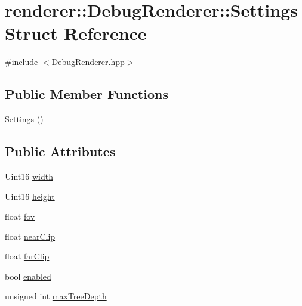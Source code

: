 \hypertarget{structrenderer_1_1DebugRenderer_1_1Settings}{\section{renderer\-:\-:Debug\-Renderer\-:\-:Settings Struct Reference}
\label{structrenderer_1_1DebugRenderer_1_1Settings}
}


{\ttfamily \#include $<$Debug\-Renderer.\-hpp$>$}

\subsection*{Public Member Functions}
\begin{DoxyCompactItemize}
\item 
\hyperlink{structrenderer_1_1DebugRenderer_1_1Settings_ae18a3d7d11b0ff74574f40cc35790f79}{Settings} ()
\end{DoxyCompactItemize}
\subsection*{Public Attributes}
\begin{DoxyCompactItemize}
\item 
Uint16 \hyperlink{structrenderer_1_1DebugRenderer_1_1Settings_acb80e3e6daf15e6cd798a7681e6fdb12}{width}
\item 
Uint16 \hyperlink{structrenderer_1_1DebugRenderer_1_1Settings_add135bc9fc4b150f2b90afff55f2af95}{height}
\item 
float \hyperlink{structrenderer_1_1DebugRenderer_1_1Settings_a27cdd58468aea209a6b53ca0cb0cbcef}{fov}
\item 
float \hyperlink{structrenderer_1_1DebugRenderer_1_1Settings_a4522926071f9aad85caf900687fd84ab}{near\-Clip}
\item 
float \hyperlink{structrenderer_1_1DebugRenderer_1_1Settings_ab95b5972b6bca48dd3883b053ca652b4}{far\-Clip}
\item 
bool \hyperlink{structrenderer_1_1DebugRenderer_1_1Settings_ab0ed97d9bd8567ec84e925cbca4ba199}{enabled}
\item 
unsigned int \hyperlink{structrenderer_1_1DebugRenderer_1_1Settings_aa555f98388dec0bba7571d15407e362e}{max\-Tree\-Depth}
\end{DoxyCompactItemize}


